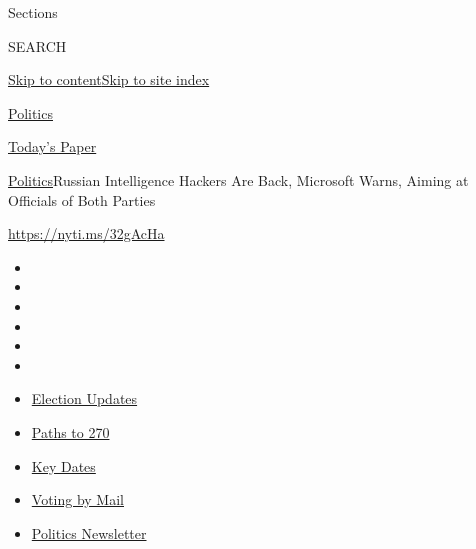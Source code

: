 Sections

SEARCH

\protect\hyperlink{site-content}{Skip to
content}\protect\hyperlink{site-index}{Skip to site index}

\href{https://www.nytimes3xbfgragh.onion/section/politics}{Politics}

\href{https://myaccount.nytimes3xbfgragh.onion/auth/login?response_type=cookie\&client_id=vi}{}

\href{https://www.nytimes3xbfgragh.onion/section/todayspaper}{Today's
Paper}

\href{/section/politics}{Politics}\textbar{}Russian Intelligence Hackers
Are Back, Microsoft Warns, Aiming at Officials of Both Parties

\url{https://nyti.ms/32gAcHa}

\begin{itemize}
\item
\item
\item
\item
\item
\item
\end{itemize}

\begin{itemize}
\item
  \href{https://www.nytimes3xbfgragh.onion/live/2020/09/11/us/trump-vs-biden?action=click\&pgtype=Article\&state=default\&region=TOP_BANNER\&context=storylines_menu}{Election
  Updates}
\item
  \href{https://www.nytimes3xbfgragh.onion/interactive/2020/us/elections/election-states-biden-trump.html?action=click\&pgtype=Article\&state=default\&region=TOP_BANNER\&context=storylines_menu}{Paths
  to 270}
\item
  \href{https://www.nytimes3xbfgragh.onion/interactive/2019/us/elections/2020-presidential-election-calendar.html?action=click\&pgtype=Article\&state=default\&region=TOP_BANNER\&context=storylines_menu}{Key
  Dates}
\item
  \href{https://www.nytimes3xbfgragh.onion/interactive/2020/08/31/us/politics/vote-by-mail-deadlines.html?action=click\&pgtype=Article\&state=default\&region=TOP_BANNER\&context=storylines_menu}{Voting
  by Mail}
\item
  \href{https://www.nytimes3xbfgragh.onion/newsletters/politics?action=click\&pgtype=Article\&state=default\&region=TOP_BANNER\&context=storylines_menu}{Politics
  Newsletter}
\end{itemize}

